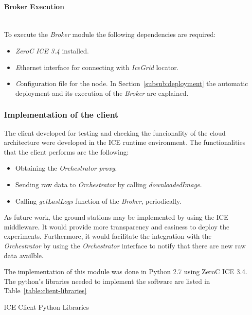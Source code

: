 \paragraph{Broker Execution}~\\

To execute the \emph{Broker} module the following dependencies
are required:
\begin{itemize}
\item \emph{ZeroC ICE 3.4} installed.
\item \emph Ethernet interface for connecting with \emph{IceGrid} locator.
\item \emph Configuration file for the node. In Section~\ref{subsub:deployment} the
  automatic deployment and its execution of the \emph{Broker} are explained. 
\end{itemize}


\subsubsection{Implementation of the client}

The client developed for testing and checking the funcionality of the cloud
architecture were developed in the ICE runtime environment. The functionalities
that the client performs are the following:
\begin{itemize}
\item Obtaining the \emph{Orchestrator proxy}.
\item Sending raw data to  \emph{Orchestrator} by calling \emph{downloadedImage}.
\item Calling \emph{getLastLogs} function of the \emph{Broker}, periodically.
\end{itemize}

As future work, the ground stations may be implemented by using the ICE
middleware. It would provide more transparency and easiness to deploy the
experiments. Furthermore, it would facilitate the integration with the
\emph{Orchestrator} by using the \emph{Orchestrator} interface to notify that
there are new raw data availble.

The implementation of this module was done in Python 2.7 using ZeroC ICE 3.4. The
python's libraries needed to implement the software are listed in
Table~\ref{table:client-libraries}

\begin{table}[hp]
  \centering
  {\small
  
  }
  \caption{ICE Client Python Libraries}
  \label{table:client-libraries}
\end{table}

